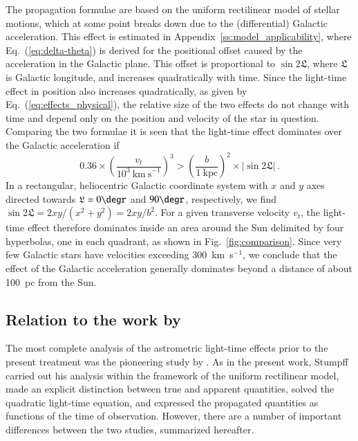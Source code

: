 \documentclass{aa}
\newcommand{\glon}{\mathfrak{L}}
\begin{document}
The propagation formulae are based on the uniform rectilinear model of stellar motions,
which at some point breaks down due to the (differential) Galactic acceleration. This effect
is estimated in Appendix~\ref{ss:model_applicability}, where Eq.~(\ref{eq:delta-theta}) is
derived for the positional offset caused by the acceleration in the Galactic plane. This
offset is proportional to $\sin 2\glon$, where $\glon$ is Galactic longitude, and increases
quadratically with time. Since the light-time effect in position also increases quadratically,
as given by Eq.~(\ref{eq:effects_physical}), the relative size of the two effects do not change
with time and depend only on the position and velocity of the star in question. Comparing the
two formulae it is seen that the light-time effect dominates over the Galactic acceleration if
\begin{equation}\label{eq:equal-effects}
    0.36
    \times\left(\frac{v_t}{10^3~\mathrm{km~s}^{-1}}\right)^3
    >
    \left(\frac{b}{1~\mathrm{kpc}}\right)^{2}
    \times\bigl|\sin 2\glon\bigr|\,.
\end{equation}
In a rectangular, heliocentric Galactic coordinate system with $x$ and $y$ axes
directed towards $\glon=0\degr$ and $90\degr$, respectively, we find
$\sin 2\glon=2xy/(x^2+y^2)=2xy/b^2$. For a given transverse velocity $v_t$,
the light-time effect therefore dominates inside an area around the Sun delimited
by four hyperbolas, one in each quadrant, as shown in Fig.~\ref{fig:comparison}.
Since very few Galactic stars have velocities exceeding 300~km~s$^{-1}$, we
conclude that the effect of the Galactic acceleration generally dominates beyond
a distance of about 100~pc from the Sun.


\subsection{Relation to the work by \citet{stumpff1985}}\label{ss:stumpff}

The most complete analysis of the astrometric light-time effects prior to the present
treatment was the pioneering study by \citet{stumpff1985}. As in the present work, Stumpff
carried out his analysis within the framework of the uniform rectilinear model, made an
explicit distinction between true and apparent quantities, solved the quadratic light-time
equation, and expressed the propagated quantities as functions of the time of observation.
However, there are a number of important differences between the two studies,
summarized hereafter.
\end{document}

